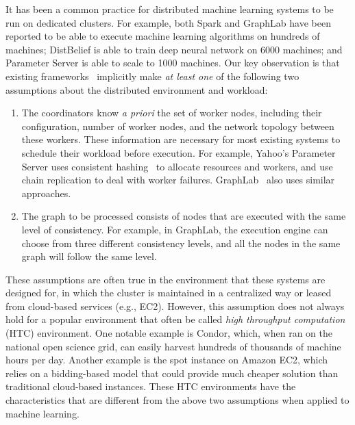 \documentclass[11pt]{article}
\begin{document}
It has been a common practice for distributed machine
learning systems to be run on dedicated clusters.
For example, both Spark and GraphLab have been 
reported to be able to execute machine learning algorithms
on hundreds of machines; DistBelief is able to 
train deep neural network on 6000 machines; and 
Parameter Server is able to scale to 1000 machines.
Our key observation is that existing frameworks~\cite{Li:2014:OSDI,
GraphLab:OSDI,Spark,Google,Yahoo} implicitly
make {\em at least one} of the following two assumptions
about the distributed environment and workload:

\begin{enumerate}
\item The coordinators know {\em a priori} 
the set of worker nodes, including their configuration,
number of worker nodes, and the network topology between
these workers. These information are necessary for most
existing systems to schedule their workload before
execution. For example, Yahoo's Parameter Server
uses consistent hashing~\cite{Li:2014:OSDI} to allocate
resources and workers, and use chain replication to
deal with worker failures. GraphLab~\cite{GraphLab:OSDI} also
uses similar approaches. 
\item The graph to be processed consists of nodes that are 
executed with the same level of consistency. For example,
in GraphLab, the execution engine can choose from three
different consistency levels, and all the nodes in the same
graph will follow the same level.  
\end{enumerate}

These assumptions are often true in the environment that
these systems are designed for, in which the cluster is
maintained in a centralized way or leased from cloud-based
services (e.g., EC2). However, this assumption
does not always hold for a popular environment that
often be called {\em high throughput computation} (HTC) 
environment. One notable example is Condor, which,
when ran on the national open science grid, can easily
harvest hundreds of thousands of machine hours per day.
Another example is the spot instance on Amazon EC2, which 
relies on a bidding-based model that could provide much
cheaper solution than traditional cloud-based instances.
These HTC environments have the characteristics that are
different from the above two assumptions when applied to 
machine learning.
\end{document}
